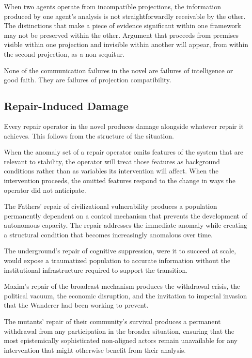 \documentclass[12pt, a4paper]{article}
\theoremstyle{plain}
\theoremstyle{definition}
\theoremstyle{remark}
\begin{document}
When two agents operate from incompatible
projections, the information produced by one
agent's analysis is not straightforwardly
receivable by the other. The distinctions that
make a piece of evidence significant within one
framework may not be preserved within the other.
Argument that proceeds from premises visible
within one projection and invisible within another
will appear, from within the second projection,
as a non sequitur.

None of the communication failures in the novel
are failures of intelligence or good faith. They
are failures of projection compatibility.

\subsection{Repair-Induced Damage}

Every repair operator in the novel produces damage
alongside whatever repair it achieves. This follows
from the structure of the situation.

When the anomaly set of a repair operator omits
features of the system that are relevant to
stability, the operator will treat those features
as background conditions rather than as variables
its intervention will affect. When the intervention
proceeds, the omitted features respond to the
change in ways the operator did not anticipate.

The Fathers' repair of civilizational vulnerability
produces a population permanently dependent on a
control mechanism that prevents the development
of autonomous capacity. The repair addresses the
immediate anomaly while creating a structural
condition that becomes increasingly anomalous
over time.

The underground's repair of cognitive suppression,
were it to succeed at scale, would expose a
traumatized population to accurate information
without the institutional infrastructure required
to support the transition.

Maxim's repair of the broadcast mechanism produces
the withdrawal crisis, the political vacuum, the
economic disruption, and the invitation to imperial
invasion that the Wanderer had been working to
prevent.

The mutants' repair of their community's survival
produces a permanent withdrawal from any
participation in the broader situation, ensuring
that the most epistemically sophisticated
non-aligned actors remain unavailable for any
intervention that might otherwise benefit from
their analysis.
\end{document}
